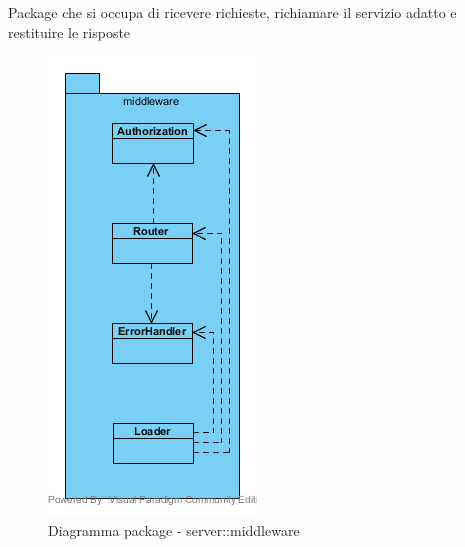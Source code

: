 Package che si occupa di ricevere richieste, richiamare il servizio adatto e restituire le risposte\begin{center}
	\begin{figure}[H]
		\centering \includegraphics[scale=4, max width=\textwidth, max height=\myheight]{../img/diagrammiClassi/server/middleware.png}
		\caption{Diagramma package - server::middleware}
	\end{figure}
\end{center}\hypertarget{server::middleware::Router}{}
